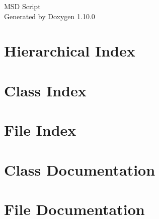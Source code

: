 \documentclass[twoside]{book}
\newcommand{\+}{\discretionary{\mbox{\scriptsize$\hookleftarrow$}}{}{}}
\newcommand{\clearemptydoublepage}{%
    \newpage{\pagestyle{empty}\cleardoublepage}%
  }
\begin{document}
  \raggedbottom
    \hypersetup{pageanchor=false,
                bookmarksnumbered=true,
                pdfencoding=unicode
               }
  \begin{titlepage}
  \vspace*{7cm}
  \begin{center}%
  {\Large MSD Script}\\
  \vspace*{1cm}
  {\large Generated by Doxygen 1.10.0}\\
  \end{center}
  \end{titlepage}
  \clearemptydoublepage
  \tableofcontents
  \clearemptydoublepage
  \hypersetup{pageanchor=true}

\chapter{Hierarchical Index}

\chapter{Class Index}

\chapter{File Index}

\chapter{Class Documentation}





\chapter{File Documentation}



  \backmatter
  \newpage
  \clearemptydoublepage
  \printindex
\end{document}
